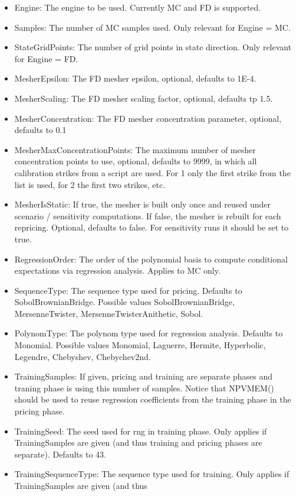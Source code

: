 \begin{itemize}
\item Engine: The engine to be used. Currently MC and FD is supported.
\item Samples: The number of MC samples used. Only relevant for Engine = MC.
\item StateGridPoints: The number of grid points in state direction. Only relevant for Engine = FD.
\item MesherEpsilon: The FD mesher epsilon, optional, defaults to 1E-4.
\item MesherScaling: The FD mesher scaling factor, optional, defaults tp 1.5.
\item MesherConcentration: The FD mesher concentration parameter, optional, defaults to 0.1
\item MesherMaxConcentrationPoints: The maximum number of mesher concentration points to use, optional, defaults to
  9999, in which all calibration strikes from a script are used. For 1 only the first strike from the list is used, for
  2 the first two strikes, etc.
\item MesherIsStatic: If true, the mesher is built only once and reused under scenario / sensitivity computations. If
  false, the mesher is rebuilt for each repricing. Optional, defaults to false. For sensitivity runs it should be set to
  true.
\item RegressionOrder: The order of the polynomial basis to compute conditional expectations via regression
  analysis. Applies to MC only.
\item SequenceType: The sequence type used for pricing. Defaults to SobolBrownianBridge. Possible values
  SobolBrownianBridge, MersenneTwister, MersenneTwisterAnithetic, Sobol.
\item PolynomType: The polynom type used for regression analysis. Defaults to Monomial. Possible values Monomial,
  Laguerre, Hermite, Hyperbolic, Legendre, Chebyshev, Chebychev2nd.
\item TrainingSamples: If given, pricing and training are separate phases and traning phase is using this number of
  samples. Notice that NPVMEM() should be used to reuse regression coefficients from the training phase in the pricing
  phase.
\item TrainingSeed: The seed used for rng in training phase. Only applies if TrainingSamples are given (and thus
  training and pricing phases are separate). Defaults to 43.
\item TrainingSequenceType: The sequence type used for training. Only applies if TrainingSamples are given (and thus

\end{itemize}
